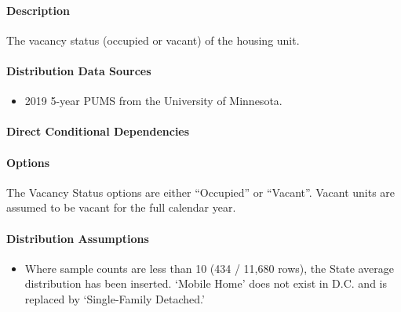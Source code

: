 \paragraph{Description}
% 
The vacancy status (occupied or vacant) of the housing unit.

\paragraph{Distribution Data Sources}
% 
\begin{itemize}
\item
  2019 5-year PUMS from the University of Minnesota.
\end{itemize}

\paragraph{Direct Conditional Dependencies}


\paragraph{Options}
The Vacancy Status options are either ``Occupied'' or ``Vacant''. Vacant units are assumed to be vacant for the full calendar year.

\paragraph{Distribution Assumptions}
% 
\begin{itemize}
\item
  Where sample counts are less than 10 (434 / 11,680 rows), the State
  average distribution has been inserted. `Mobile
  Home' does not exist in D.C. and is replaced by
  `Single-Family Detached.'
\end{itemize}
